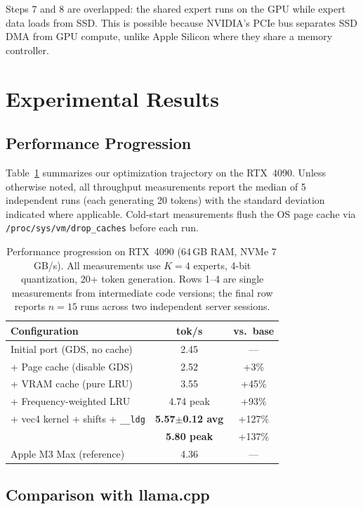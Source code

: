 \documentclass[11pt]{article}
\begin{document}
Steps 7 and 8 are overlapped: the shared expert runs on the GPU while expert data loads from SSD. This is possible because NVIDIA's PCIe bus separates SSD DMA from GPU compute, unlike Apple Silicon where they share a memory controller.

\section{Experimental Results}

\subsection{Performance Progression}

Table~\ref{tab:results} summarizes our optimization trajectory on the RTX~4090. Unless otherwise noted, all throughput measurements report the median of 5 independent runs (each generating 20 tokens) with the standard deviation indicated where applicable. Cold-start measurements flush the OS page cache via \texttt{/proc/sys/vm/drop\_caches} before each run.

\begin{table}[h]
\centering
\small
\caption{Performance progression on RTX~4090 (64\,GB RAM, NVMe 7\,GB/s). All measurements use $K=4$ experts, 4-bit quantization, 20+ token generation. Rows 1--4 are single measurements from intermediate code versions; the final row reports $n=15$ runs across two independent server sessions.}
\label{tab:results}
\begin{tabular}{lcc}
\toprule
\textbf{Configuration} & \textbf{tok/s} & \textbf{vs.\ base} \\
\midrule
Initial port (GDS, no cache) & 2.45 & --- \\
+ Page cache (disable GDS) & 2.52 & +3\% \\
+ VRAM cache (pure LRU) & 3.55 & +45\% \\
+ Frequency-weighted LRU & 4.74 peak & +93\% \\
+ vec4 kernel + shifts + \texttt{\_\_ldg} & \textbf{5.57$\pm$0.12 avg} & +127\% \\
& \textbf{5.80 peak} & +137\% \\
\midrule
Apple M3 Max (reference) & 4.36 & --- \\
\bottomrule
\end{tabular}
\end{table}

\subsection{Comparison with llama.cpp}
\end{document}
